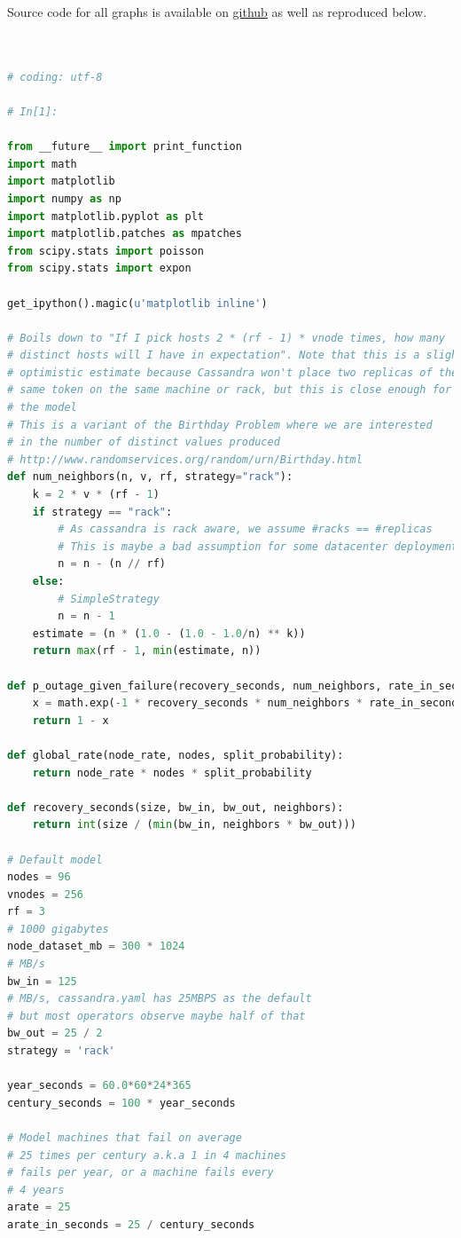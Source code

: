 \documentclass{article}
\begin{document}
Source code for all graphs is available on \href{https://github.com/jolynch/python_performance_toolkit/blob/master/notebooks/cassandra_availability/cassandra_availability.ipynb}{github} as well as reproduced below.
\begin{lstlisting}[language=Python]


# coding: utf-8

# In[1]:

from __future__ import print_function
import math
import matplotlib
import numpy as np
import matplotlib.pyplot as plt
import matplotlib.patches as mpatches
from scipy.stats import poisson
from scipy.stats import expon

get_ipython().magic(u'matplotlib inline')

# Boils down to "If I pick hosts 2 * (rf - 1) * vnode times, how many
# distinct hosts will I have in expectation". Note that this is a slightly
# optimistic estimate because Cassandra won't place two replicas of the
# same token on the same machine or rack, but this is close enough for
# the model
# This is a variant of the Birthday Problem where we are interested
# in the number of distinct values produced
# http://www.randomservices.org/random/urn/Birthday.html
def num_neighbors(n, v, rf, strategy="rack"):
    k = 2 * v * (rf - 1)
    if strategy == "rack":
        # As cassandra is rack aware, we assume #racks == #replicas
        # This is maybe a bad assumption for some datacenter deployments
        n = n - (n // rf)
    else:
        # SimpleStrategy
        n = n - 1
    estimate = (n * (1.0 - (1.0 - 1.0/n) ** k))
    return max(rf - 1, min(estimate, n))

def p_outage_given_failure(recovery_seconds, num_neighbors, rate_in_seconds):
    x = math.exp(-1 * recovery_seconds * num_neighbors * rate_in_seconds)
    return 1 - x

def global_rate(node_rate, nodes, split_probability):
    return node_rate * nodes * split_probability

def recovery_seconds(size, bw_in, bw_out, neighbors):
    return int(size / (min(bw_in, neighbors * bw_out)))

# Default model
nodes = 96
vnodes = 256
rf = 3
# 1000 gigabytes
node_dataset_mb = 300 * 1024
# MB/s
bw_in = 125
# MB/s, cassandra.yaml has 25MBPS as the default
# but most operators observe maybe half of that
bw_out = 25 / 2
strategy = 'rack'

year_seconds = 60.0*60*24*365
century_seconds = 100 * year_seconds

# Model machines that fail on average
# 25 times per century a.k.a 1 in 4 machines
# fails per year, or a machine fails every
# 4 years
arate = 25
arate_in_seconds = 25 / century_seconds



\end{lstlisting}
\end{document}
